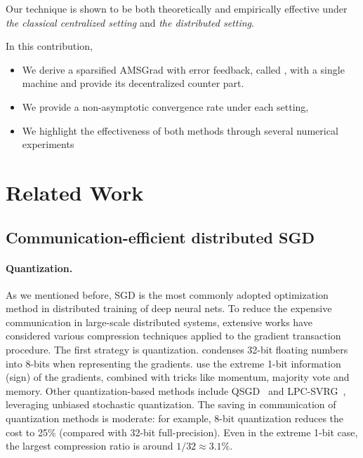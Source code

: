 \documentclass[11pt]{article}
\begin{document}
Our technique is shown to be both theoretically and empirically effective under \emph{the classical centralized setting} and \emph{the distributed setting}.

In this contribution, 
\begin{itemize}
\item We derive a sparsified AMSGrad with error feedback, called \algo, with a single machine and provide its decentralized counter part.
\item We provide a non-asymptotic convergence rate under each setting,
\item We highlight the effectiveness of both methods through several numerical experiments
\end{itemize}


\section{Related Work}\label{sec:related}

\subsection{Communication-efficient distributed SGD}

\paragraph{Quantization.} As we mentioned before, SGD is the most commonly adopted optimization method in distributed training of deep neural nets. To reduce the expensive communication in large-scale distributed systems, extensive works have considered various compression techniques applied to the gradient transaction procedure. The first strategy is quantization. \cite{Proc:8-bit_ICLR16} condenses 32-bit floating numbers into 8-bits when representing the gradients. \cite{Proc:Seide14,bernstein2018signsgd,karimireddy2019error,Proc:Bernstein_ICLR19} use the extreme 1-bit information (sign) of the gradients, combined with tricks like momentum, majority vote and memory. Other quantization-based methods include QSGD~\cite{alistarh2017qsgd,Proc:Wu_ICML18,Proc:Zhang_ICML17} and LPC-SVRG~\cite{Proc:Yu_AISTATS19}, leveraging unbiased stochastic quantization. The saving in communication of quantization methods is moderate: for example, 8-bit quantization reduces the cost to 25\% (compared with 32-bit full-precision). Even in the extreme 1-bit case, the largest compression ratio is around $1/32\approx 3.1\%$. 
\end{document}

